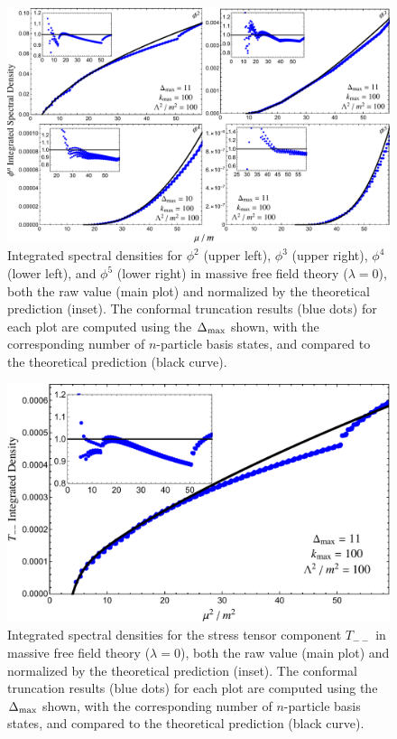 \begin{figure}[t!]
\begin{center}
\includegraphics[width=\textwidth]{truncation_chapter/FreePhiN}
\caption{Integrated spectral densities for $\phi^2$ (upper left), $\phi^3$ (upper right), $\phi^4$ (lower left), and $\phi^5$ (lower right) in massive free field theory ($\lambda=0$), both the raw value (main plot) and normalized by the theoretical prediction (inset). The conformal truncation results (blue dots) for each plot are computed using the $\Delta_{\max}$ shown, with the corresponding number of $n$-particle basis states, and compared to the theoretical prediction (black curve).}
\label{fig:FreeDensities} 
\end{center}
\end{figure}

\begin{figure}[t!]
\begin{center}
\includegraphics[width=\textwidth]{truncation_chapter/Tmm}
\caption{Integrated spectral densities for the stress tensor component $T_{--}$ in massive free field theory ($\lambda=0$), both the raw value (main plot) and normalized by the theoretical prediction (inset). The conformal truncation results (blue dots) for each plot are computed using the $\Delta_{\max}$ shown, with the corresponding number of $n$-particle basis states, and compared to the theoretical prediction (black curve).}
\label{fig:FreeDensitiesTmm} 
\end{center}
\end{figure}

